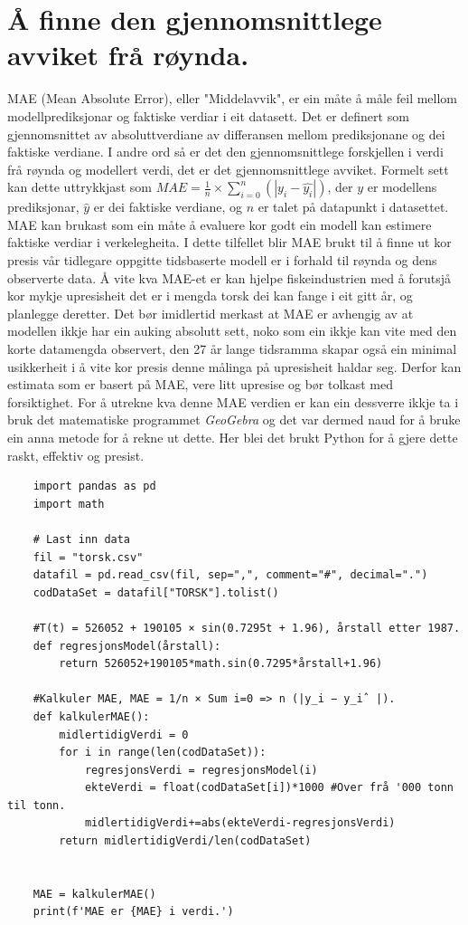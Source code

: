 \documentclass{report}
\begin{document}
\section{Å finne den gjennomsnittlege avviket frå røynda.}
MAE (Mean Absolute Error), eller "Middelavvik", er ein måte å måle feil mellom modellprediksjonar og faktiske verdiar i eit datasett.
Det er definert som gjennomsnittet av absoluttverdiane av differansen mellom prediksjonane og dei faktiske verdiane.
I andre ord så er det den gjennomsnittlege forskjellen i verdi frå røynda og modellert verdi, det er det gjennomsnittlege avviket.
Formelt sett kan dette uttrykkjast som $MAE = \frac{1}{n}\times \sum_{i=0}^{n}(|y_i - \hat{y_i}|)$, der $y$ er modellens prediksjonar, $\hat{y}$ er dei faktiske verdiane, og $n$ er talet på datapunkt i datasettet.
MAE kan brukast som ein måte å evaluere kor godt ein modell kan estimere faktiske verdiar i verkelegheita.
I dette tilfellet blir MAE brukt til å finne ut kor presis vår tidlegare oppgitte tidsbaserte modell er i forhald til røynda og dens observerte data.
Å vite kva MAE-et er kan hjelpe fiskeindustrien med å forutsjå kor mykje upresisheit det er i mengda torsk dei kan fange i eit gitt år, og planlegge deretter.
Det bør imidlertid merkast at MAE er avhengig av at modellen ikkje har ein auking absolutt sett, noko som ein ikkje kan vite med den korte datamengda observert, den 27 år lange tidsramma skapar også ein minimal usikkerheit i å vite kor presis denne målinga på upresisheit haldar seg.
Derfor kan estimata som er basert på MAE, vere litt upresise og bør tolkast med forsiktighet.
For å utrekne kva denne MAE verdien er kan ein dessverre ikkje ta i bruk det matematiske programmet \textit{GeoGebra} og det var dermed naud for å bruke ein anna metode for å rekne ut dette.
Her blei det brukt Python for å gjere dette raskt, effektiv og presist.
\begin{verbatim}
    import pandas as pd
    import math

    # Last inn data
    fil = "torsk.csv"
    datafil = pd.read_csv(fil, sep=",", comment="#", decimal=".")
    codDataSet = datafil["TORSK"].tolist()

    #T(t) = 526052 + 190105 × sin(0.7295t + 1.96), årstall etter 1987.
    def regresjonsModel(årstall):
        return 526052+190105*math.sin(0.7295*årstall+1.96)

    #Kalkuler MAE, MAE = 1/n × Sum i=0 => n (|y_i − y_iˆ |).
    def kalkulerMAE():
        midlertidigVerdi = 0
        for i in range(len(codDataSet)):
            regresjonsVerdi = regresjonsModel(i)
            ekteVerdi = float(codDataSet[i])*1000 #Over frå '000 tonn til tonn.
            midlertidigVerdi+=abs(ekteVerdi-regresjonsVerdi)
        return midlertidigVerdi/len(codDataSet)


    MAE = kalkulerMAE()
    print(f'MAE er {MAE} i verdi.')
\end{verbatim}
\end{document}
